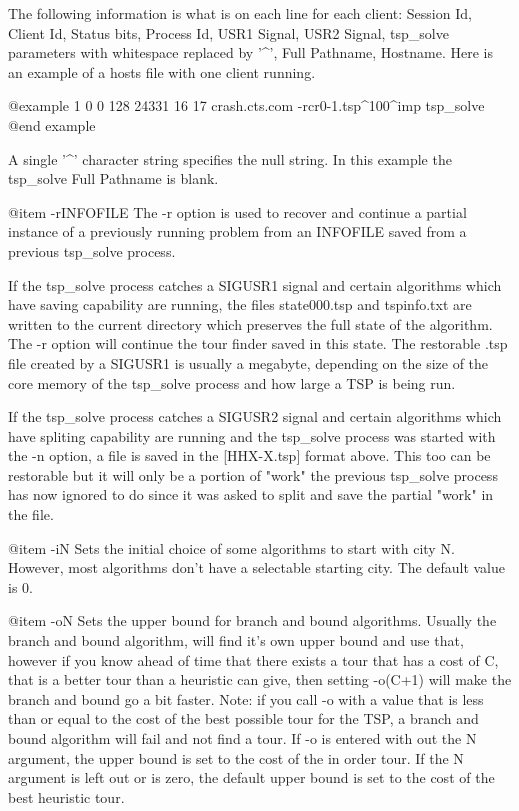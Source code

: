 The following information is what is on each line for each client: Session Id,
Client Id, Status bits, Process Id, USR1 Signal, USR2 Signal, tsp_solve
parameters with whitespace replaced by '^', Full Pathname, Hostname.  Here is
an example of a hosts file with one client running.

@example
1
0  0   128 24331 16 17 crash.cts.com -rcr0-1.tsp^100^imp tsp_solve
@end example

A single '^' character string specifies the null string.  In this example
the tsp_solve Full Pathname is blank. 

@item -rINFOFILE
The -r option is used to recover and continue a partial instance of a
previously running problem from an INFOFILE saved from a previous tsp_solve
process.

If the tsp_solve process catches a SIGUSR1 signal and certain algorithms
which have saving capability are running, the files state000.tsp and
tspinfo.txt are written to the current directory which preserves the full
state of the algorithm.  The -r option will continue the tour finder saved in
this state.  The restorable .tsp file created by a SIGUSR1 is usually a
megabyte, depending on the size of the core memory of the tsp_solve process
and how large a TSP is being run.

If the tsp_solve process catches a SIGUSR2 signal and certain algorithms
which have spliting capability are running and the tsp_solve process was
started with the -n option, a file is saved in the [HHX-X.tsp] format above.
This too can be restorable but it will only be a portion of "work" the previous
tsp_solve process has now ignored to do since it was asked to split and save
the partial "work" in the file.

@item -iN
Sets the initial choice of some algorithms to start with city N.  However, most
algorithms don't have a selectable starting city.  The default value is 0.

@item -oN
Sets the upper bound for branch and bound algorithms.  Usually the branch and
bound algorithm, will find it's own upper bound and use that, however if you
know ahead of time that there exists a tour that has a cost of C, that is a
better tour than a heuristic can give, then setting -o(C+1) will make the
branch and bound go a bit faster.  Note: if you call -o with a value that is
less than or equal to the cost of the best possible tour for the TSP, a branch
and bound algorithm will fail and not find a tour.  If -o is entered with out
the N argument, the upper bound is set to the cost of the in order tour.  If
the N argument is left out or is zero, the default upper bound is set to the
cost of the best heuristic tour.

